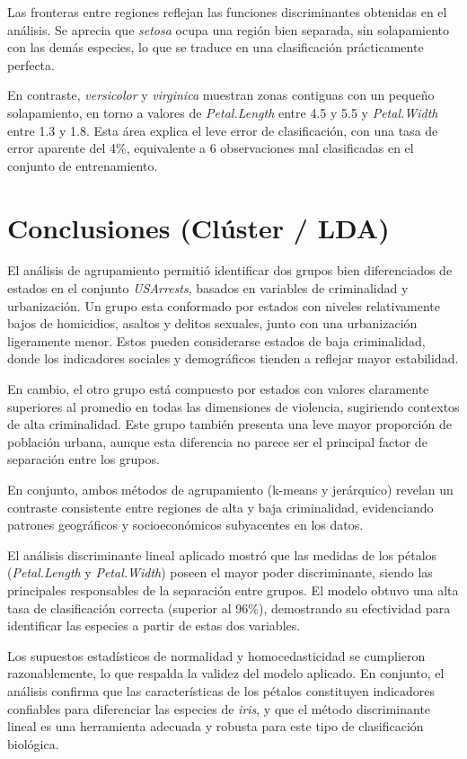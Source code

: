 \documentclass[
  spanish,
  11pt,
  a4paper,
  DIV=11,
  numbers=noendperiod]{scrartcl}
\begin{document}
Las fronteras entre regiones reflejan las funciones discriminantes
obtenidas en el análisis. Se aprecia que \emph{setosa} ocupa una región
bien separada, sin solapamiento con las demás especies, lo que se
traduce en una clasificación prácticamente perfecta.

En contraste, \emph{versicolor} y \emph{virginica} muestran zonas
contiguas con un pequeño solapamiento, en torno a valores de
\emph{Petal.Length} entre 4.5 y 5.5 y \emph{Petal.Width} entre 1.3 y
1.8. Esta área explica el leve error de clasificación, con una tasa de
error aparente del 4\%, equivalente a 6 observaciones mal clasificadas
en el conjunto de entrenamiento.

\section{Conclusiones (Clúster /
LDA)}\label{conclusiones-cluxfaster-lda}

El análisis de agrupamiento permitió identificar dos grupos bien
diferenciados de estados en el conjunto \emph{USArrests}, basados en
variables de criminalidad y urbanización. Un grupo esta conformado por
estados con niveles relativamente bajos de homicidios, asaltos y delitos
sexuales, junto con una urbanización ligeramente menor. Estos pueden
considerarse estados de baja criminalidad, donde los indicadores
sociales y demográficos tienden a reflejar mayor estabilidad.

En cambio, el otro grupo está compuesto por estados con valores
claramente superiores al promedio en todas las dimensiones de violencia,
sugiriendo contextos de alta criminalidad. Este grupo también presenta
una leve mayor proporción de población urbana, aunque esta diferencia no
parece ser el principal factor de separación entre los grupos.

En conjunto, ambos métodos de agrupamiento (k-means y jerárquico)
revelan un contraste consistente entre regiones de alta y baja
criminalidad, evidenciando patrones geográficos y socioeconómicos
subyacentes en los datos.

El análisis discriminante lineal aplicado mostró que las medidas de los
pétalos (\emph{Petal.Length} y \emph{Petal.Width}) poseen el mayor poder
discriminante, siendo las principales responsables de la separación
entre grupos. El modelo obtuvo una alta tasa de clasificación correcta
(superior al 96\%), demostrando su efectividad para identificar las
especies a partir de estas dos variables.

Los supuestos estadísticos de normalidad y homocedasticidad se
cumplieron razonablemente, lo que respalda la validez del modelo
aplicado. En conjunto, el análisis confirma que las características de
los pétalos constituyen indicadores confiables para diferenciar las
especies de \emph{iris}, y que el método discriminante lineal es una
herramienta adecuada y robusta para este tipo de clasificación
biológica.
\end{document}
